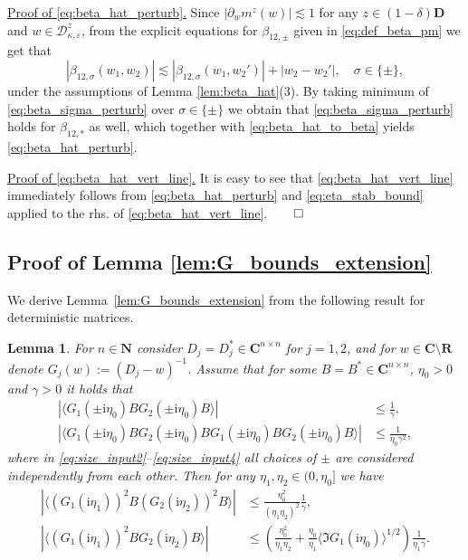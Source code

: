 \documentclass[10pt]{amsart}
\newtheorem{lemma}[theorem]{Lemma}
\numberwithin{equation}{section}
\newcommand{\R}{\mathbf{R}}
\newcommand{\C}{\mathbf{C}}
\newcommand{\N}{\mathbf{N}}
\newcommand{\ii}{\mathrm{i}}
\begin{document}
\medskip

\noindent\underline{Proof of \eqref{eq:beta_hat_perturb}.} Since $|\partial_w m^z(w)|\lesssim 1$ for any $z\in (1-\delta)\mathbf{D}$ and $w\in \mathcal{D}^z_{\kappa,\varepsilon}$, from the explicit equations for $\beta_{12, \pm}$ given in \eqref{eq:def_beta_pm} we get that
\begin{equation}
|\beta_{12,\sigma}(w_1,w_2)|\lesssim |\beta_{12,\sigma}(w_1,w_2')|+|w_2-w_2'|,\quad \sigma\in\{\pm\},
\label{eq:beta_sigma_perturb}
\end{equation}
under the assumptions of Lemma \ref{lem:beta_hat}(3). By taking minimum of \eqref{eq:beta_sigma_perturb} over $\sigma\in\{\pm\}$ we obtain that \eqref{eq:beta_sigma_perturb} holds for $\beta_{12,*}$ as well, which together with \eqref{eq:beta_hat_to_beta} yields \eqref{eq:beta_hat_perturb}.

\medskip

\noindent\underline{Proof of \eqref{eq:beta_hat_vert_line}.} It is easy to see that \eqref{eq:beta_hat_vert_line} immediately follows from \eqref{eq:beta_hat_perturb} and \eqref{eq:eta_stab_bound} applied to the rhs. of \eqref{eq:beta_hat_vert_line}.\hfill$\qed$



\subsection{Proof of Lemma \ref{lem:G_bounds_extension}}\label{app:G_bounds_extension}

We derive Lemma~\ref{lem:G_bounds_extension} from the following result for deterministic matrices.

\begin{lemma}\label{lem:size_bound_extension} For $n\in\N$ consider $D_j=D_j^*\in \C^{n\times n}$ for $j=1,2$, and for $w\in\C\setminus\R$ denote $G_j(w):=(D_j-w)^{-1}$. Assume that for some $B=B^*\in\C^{n\times n}$, $\eta_0>0$ and $\gamma>0$ it holds that
\begin{align}
\left\vert\langle G_1(\pm\ii\eta_0)BG_2(\pm\ii\eta_0)B\rangle\right\vert &\le \frac{1}{\gamma},\label{eq:size_input2}\\
\left\vert \langle G_1(\pm\ii\eta_0)BG_2(\pm\ii\eta_0)BG_1(\pm\ii\eta_0)BG_2(\pm\ii\eta_0)B\rangle\right\vert &\le \frac{1}{\eta_0\gamma^2},\label{eq:size_input4} 
\end{align}
where in \eqref{eq:size_input2}--\eqref{eq:size_input4} all choices of $\pm$ are considered independently from each other. Then for any $\eta_1,\eta_2\in (0,\eta_0]$ we have
\begin{align}
\left\vert\langle (G_1(\ii\eta_1))^2 B (G_2(\ii\eta_2))^2B\rangle\right\vert &\le \frac{\eta_0^2}{(\eta_1\eta_2)^2}\frac{1}{\gamma},\label{eq:size_bound1}\\
\left\vert\langle (G_1(\ii\eta_1))^2 B G_2(\ii\eta_2)B\rangle\right\vert &\le\left(\frac{\eta_0^2}{\eta_1\eta_2}+\frac{\eta_0}{\eta_1} \langle \Im G_1(\ii\eta_0)\rangle^{1/2}\right)\frac{1}{\eta_1\gamma}.\label{eq:size_bound2}
\end{align}
\end{lemma}
\end{document}
